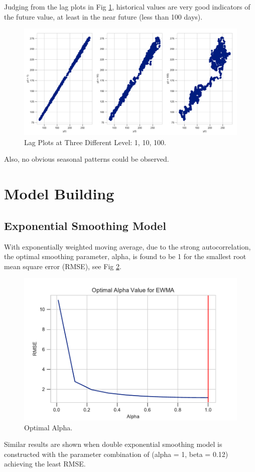\documentclass[]{article}
\begin{document}
%
Judging from the lag plots in Fig \ref{fig:three_lag_plots}, historical values are very good indicators of the future value, at least in the near future (less than 100 days). 
%
\begin{figure}[hbtp]
	\centering
	\includegraphics[width=1\columnwidth]{../Figures/three_lag_plots.pdf}
	\caption{Lag Plots at Three Different Level: 1, 10, 100.}
	\label{fig:three_lag_plots}
\end{figure}
%
Also, no obvious seasonal patterns could be observed. 


\section{Model Building}
\subsection{Exponential Smoothing Model}
With exponentially weighted moving average, due to the strong autocorrelation, the optimal smoothing parameter, alpha, is found to be 1 for the smallest root mean square error (RMSE), see Fig \ref{fig:optimal_alpha_ewma}.
%
\begin{figure}[hbtp]
	\centering
	\includegraphics[width=1\columnwidth]{../Figures/optimal_alpha_ewma.pdf}
	\caption{Optimal Alpha.}
	\label{fig:optimal_alpha_ewma}
\end{figure}
%
Similar results are shown when double exponential smoothing model is constructed with the parameter combination of (alpha = 1, beta = 0.12) achieving the least RMSE. 
\end{document}
